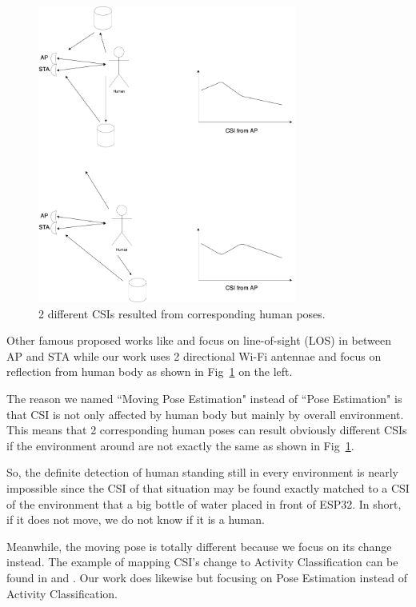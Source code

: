 \documentclass[10pt,letterpaper]{article}
\begin{document}
	\begin{figure}[htbp]
		
		\centerline{\includegraphics[width=85mm,scale=0.5]{ESP32CSI03.png}}
		\caption{2 different CSIs resulted from corresponding human poses.}
		\label{fig:ESP32CSI02}
	\end{figure}
	
	Other famous proposed works like \cite{wangF} \cite{liuJ} and \cite{hernandezSM} focus on line-of-sight (LOS) in between AP and STA while our work uses 2 directional Wi-Fi antennae and focus on reflection from human body as shown in Fig~\ref{fig:ESP32CSI02} on the left.
	
	
	The reason we named ``Moving Pose Estimation" instead of ``Pose Estimation" is that CSI is not only affected by human body but mainly by overall environment. This means that 2 corresponding human poses can result obviously different CSIs if the environment around are not exactly the same as shown in Fig~\ref{fig:ESP32CSI02}.
	
	
	So, the definite detection of human standing still in every environment is nearly impossible since the CSI of that situation may be found exactly matched to a CSI of the environment that a big bottle of water placed in front of ESP32.
	In short, if it does not move, we do not know if it is a human.
	
	Meanwhile, the moving pose is totally different because we focus on its change instead. The example of mapping CSI's change to Activity Classification can be found in \cite{chowdhuryTZ} and \cite{zouH}. Our work does likewise but focusing on Pose Estimation instead of Activity Classification.
	
\end{document}
